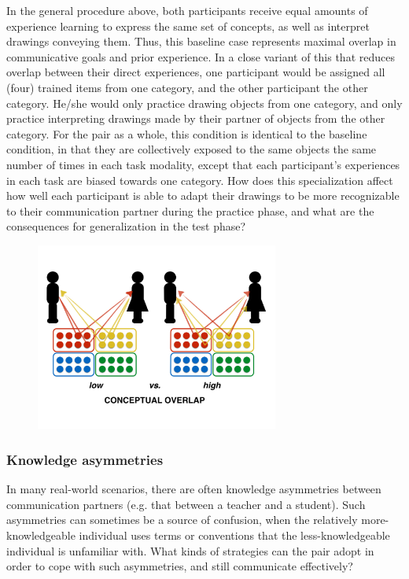 \documentclass[12pt]{article}
\begin{document}
In the general procedure above, both participants receive equal amounts of experience learning to express the same set of concepts, as well as interpret drawings conveying them. Thus, this baseline case represents maximal overlap in communicative goals and prior experience. In a close variant of this that reduces overlap between their direct experiences, one participant would be assigned all (four) trained items from one category, and the other participant the other category. He/she would only practice drawing objects from one category, and only practice interpreting drawings made by their partner of objects from the other category. For the pair as a whole, this condition is identical to the baseline condition, in that they are collectively exposed to the same objects the same number of times in each task modality, except that each participant's experiences in each task are biased towards one category. How does this specialization affect how well each participant is able to adapt their drawings to be more recognizable to their communication partner during the practice phase, and what are the consequences for generalization in the test phase?

\begin{figure}[hbtp]
\begin{center}
\includegraphics[width=80mm]{figures/conceptual_overlap.pdf}
\end{center}
\end{figure}
\vspace{-5mm}

\subsubsection{Knowledge asymmetries} In many real-world scenarios, there are often knowledge asymmetries between communication partners (e.g. that between a teacher and a student). Such asymmetries can sometimes be a source of confusion, when the relatively more-knowledgeable individual uses terms or conventions that the less-knowledgeable individual is unfamiliar with. What kinds of strategies can the pair adopt in order to cope with such asymmetries, and still communicate effectively? 
\end{document}
